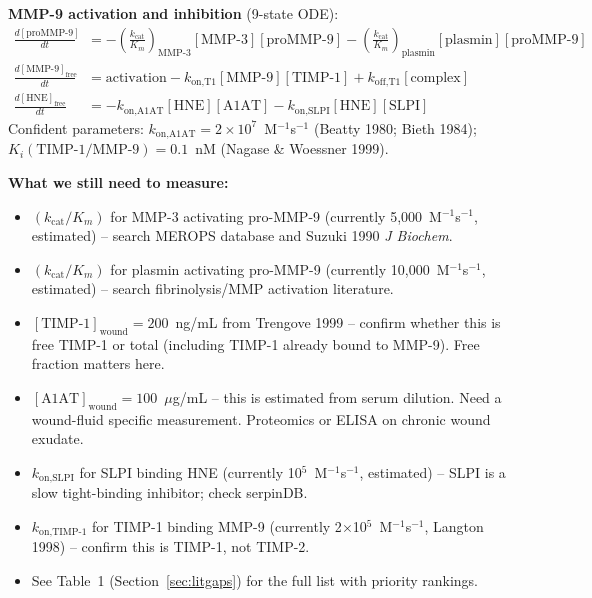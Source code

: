 \documentclass[10pt,a4paper]{article}
\newenvironment{needsbox}{%
  \begin{lrbox}{\tmpbox}\begin{minipage}{0.965\textwidth}\vspace{0.2em}%
  \textbf{\textcolor{ambertext}{What we still need to measure:}}\par\vspace{0.15em}}%
 {\vspace{0.2em}\end{minipage}\end{lrbox}%
  \par\vspace{0.4em}\noindent\colorbox{boxamber}{\usebox{\tmpbox}}\par\vspace{0.4em}}
\newenvironment{eqbox}{%
  \begin{lrbox}{\tmpbox}\begin{minipage}{0.965\textwidth}\vspace{0.2em}}%
 {\vspace{0.2em}\end{minipage}\end{lrbox}%
  \par\vspace{0.3em}\noindent\colorbox{boxgray}{\usebox{\tmpbox}}\par\vspace{0.3em}}
\newcommand{\confirmed}[1]{\textcolor{confgreen}{#1}}
\begin{document}
\begin{eqbox}
\textbf{MMP-9 activation and inhibition} (9-state ODE):
\begin{align*}
\frac{d[\text{proMMP-9}]}{dt} &= -\left(\frac{k_\text{cat}}{K_m}\right)_\text{MMP-3}[\text{MMP-3}]
    [\text{proMMP-9}] - \left(\frac{k_\text{cat}}{K_m}\right)_\text{plasmin}[\text{plasmin}][\text{proMMP-9}]\\
\frac{d[\text{MMP-9}]_\text{free}}{dt} &= \text{activation} - k_{\text{on,T1}}[\text{MMP-9}][\text{TIMP-1}]
    + k_{\text{off,T1}}[\text{complex}]\\
\frac{d[\text{HNE}]_\text{free}}{dt} &= -k_{\text{on,A1AT}}[\text{HNE}][\text{A1AT}]
    - k_{\text{on,SLPI}}[\text{HNE}][\text{SLPI}]
\end{align*}
\confirmed{Confident parameters}: $k_{\text{on,A1AT}} = 2\times10^7$~M$^{-1}$s$^{-1}$ (Beatty 1980;
Bieth 1984); $K_i(\text{TIMP-1/MMP-9}) = 0.1$~nM (Nagase \& Woessner 1999).
\end{eqbox}

\begin{needsbox}
\begin{itemize}[noitemsep, topsep=0pt]
\item $(k_\text{cat}/K_m)$ for MMP-3 activating pro-MMP-9 (currently 5,000~M$^{-1}$s$^{-1}$, estimated) --
  search MEROPS database and Suzuki 1990 \textit{J Biochem}.
\item $(k_\text{cat}/K_m)$ for plasmin activating pro-MMP-9 (currently 10,000~M$^{-1}$s$^{-1}$, estimated) --
  search fibrinolysis/MMP activation literature.
\item $[\text{TIMP-1}]_\text{wound} = 200$~ng/mL from Trengove 1999 -- confirm whether this is
  free TIMP-1 or total (including TIMP-1 already bound to MMP-9). Free fraction matters here.
\item $[\text{A1AT}]_\text{wound} = 100$~$\mu$g/mL -- this is estimated from serum dilution.
  Need a wound-fluid specific measurement. Proteomics or ELISA on chronic wound exudate.
\item $k_{\text{on,SLPI}}$ for SLPI binding HNE (currently 10$^5$~M$^{-1}$s$^{-1}$, estimated) --
  SLPI is a slow tight-binding inhibitor; check serpinDB.
\item $k_{\text{on,TIMP-1}}$ for TIMP-1 binding MMP-9 (currently 2$\times$10$^5$~M$^{-1}$s$^{-1}$,
  Langton 1998) -- confirm this is TIMP-1, not TIMP-2.
\item See Table~1 (Section~\ref{sec:litgaps}) for the full list with priority rankings.
\end{itemize}
\end{needsbox}
\end{document}
